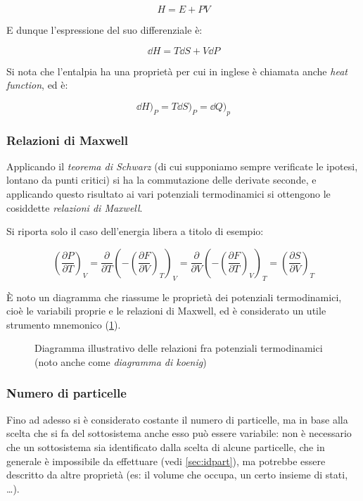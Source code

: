 \begin{equation*}
H = E + P V
\end{equation*}

E dunque l'espressione del suo differenziale è:

\begin{equation*}
\dd H = T \dd S + V \dd P
\end{equation*}

Si nota che l'entalpia ha una proprietà per cui in inglese è chiamata anche \textit{heat function}, ed è:

\begin{equation*}
\dd H)_P = T \dd S)_P = \dd Q)_p
\end{equation*}

\subsubsection{Relazioni di Maxwell}
Applicando il \textit{teorema di Schwarz} (di cui supponiamo sempre verificate le ipotesi, lontano da punti critici) si ha la commutazione delle derivate seconde, e applicando questo risultato ai vari potenziali termodinamici si ottengono le cosiddette \textit{relazioni di Maxwell}.

Si riporta solo il caso dell'energia libera a titolo di esempio:

\begin{equation*}
\left(\frac{\partial P}{\partial T}\right)_V = \frac{\partial}{\partial T} \left(- \left(\frac{\partial F}{\partial V}\right)_T\right)_V = \frac{\partial}{\partial V} \left(- \left(\frac{\partial F}{\partial T}\right)_V\right)_T = \left(\frac{\partial S}{\partial V}\right)_T
\end{equation*}

\`E noto un diagramma che riassume le proprietà dei potenziali termodinamici, cioè le variabili proprie e le relazioni di Maxwell, ed è considerato un utile strumento mnemonico (\cref{fig:maxrel}).

\begin{figure}[t]
	\centering
	
	\caption{Diagramma illustrativo delle relazioni fra potenziali termodinamici (noto anche come \textit{diagramma di koenig})}
	\label{fig:maxrel}
\end{figure}

\subsubsection{Numero di particelle}
Fino ad adesso si è considerato costante il numero di particelle, ma in base alla scelta che si fa del sottosistema anche esso può essere variabile: non è necessario che un sottosistema sia identificato dalla scelta di alcune particelle, che in generale è impossibile da effettuare (vedi \cref{sec:idpart}), ma potrebbe essere descritto da altre proprietà (es: il volume che occupa, un certo insieme di stati, \dots).

